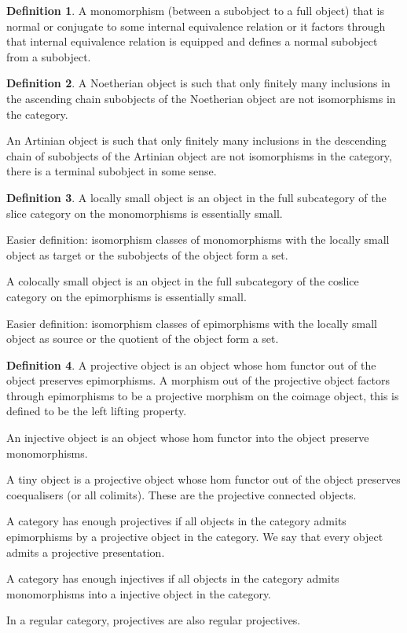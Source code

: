 \documentclass[10pt]{article}
\theoremstyle{plain}%
\theoremstyle{definition}
\newtheorem{definition}{Definition}[section]
\theoremstyle{remark}
\begin{document}
\begin{definition}
    A monomorphism (between a subobject to a full object) that is normal or conjugate to some internal equivalence relation or it factors through that internal equivalence relation is equipped and defines a normal subobject from a subobject.
\end{definition}

\begin{definition}
    A Noetherian object is such that only finitely many inclusions in the ascending chain subobjects of the Noetherian object are not isomorphisms in the category.

    An Artinian object is such that only finitely many inclusions in the descending chain of subobjects of the Artinian object are not isomorphisms in the category, there is a terminal subobject in some sense.
\end{definition}

\begin{definition}
    A locally small object is an object in the full subcategory of the slice category on the monomorphisms is essentially small.

    Easier definition: isomorphism classes of monomorphisms with the locally small object as target or the subobjects of the object form a set.

    A colocally small object is an object in the full subcategory of the coslice category on the epimorphisms is essentially small.

    Easier definition: isomorphism classes of epimorphisms with the locally small object as source or the quotient of the object form a set.
\end{definition}

\begin{definition}
    A projective object is an object whose hom functor out of the object preserves epimorphisms. A morphism out of the projective object factors through epimorphisms to be a projective morphism on the coimage object, this is defined to be the left lifting property.
    
    An injective object is an object whose hom functor into the object preserve monomorphisms.

    A tiny object is a projective object whose hom functor out of the object preserves coequalisers (or all colimits). These are the projective connected objects.

    A category has enough projectives if all objects in the category admits epimorphisms by a projective object in the category. We say that every object admits a projective presentation.

    A category has enough injectives if all objects in the category admits monomorphisms into a injective object in the category.

    In a regular category, projectives are also regular projectives.
\end{definition}
\end{document}
